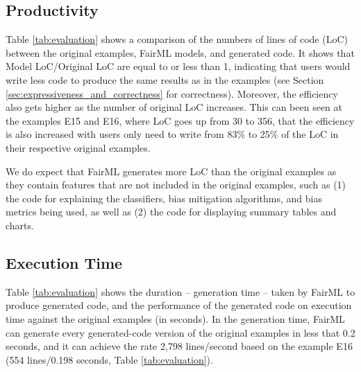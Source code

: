 \documentclass[sigconf,review]{acmart}
\begin{document}
	
	\subsection{Productivity}
	\label{sec:productivity}
	
	Table \ref{tab:evaluation} shows a comparison of the numbers of lines of code (LoC) between the original examples, FairML models, and generated code. It shows that \textsf{Model LoC}/\textsf{Original LoC} are equal to or less than 1, indicating that users would write less code to produce the same results as in the examples (see Section \ref{sec:expressiveness_and_correctness} for correctness). Moreover, the efficiency also gets higher as the number of original LoC increases. This can been seen at the examples \textsf{E15} and \textsf{E16}, where LoC goes up from 30 to 356, that the efficiency is also increased with users only need to write from 83\% to 25\% of the LoC in their respective original examples.
	
	We do expect that FairML generates more LoC than the original examples as they contain features that are not included in the original examples, such as (1) the code for explaining the classifiers, bias mitigation algorithms, and bias metrics being used, as well as (2) the code for displaying summary tables and charts. 
	
	
	
	
	\subsection{Execution Time}
	\label{sec:execution_time}
	
	Table \ref{tab:evaluation} shows the duration -- generation time -- taken by FairML to produce generated code, 
	and the performance of the generated code on execution time against the original examples (in seconds). 
	In the generation time, 
	FairML can generate every generated-code version of the original examples in less that 0.2 seconds, 
	and it can achieve the rate 2,798 lines/second based on the example E16 
	(554 lines/0.198 seconds, Table \ref{tab:evaluation}). 
	
\end{document}
